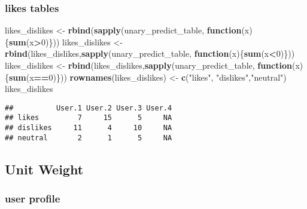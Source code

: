 \documentclass[]{article}
\newenvironment{Shaded}{\begin{snugshade}}{\end{snugshade}}
\newcommand{\ControlFlowTok}[1]{\textcolor[rgb]{0.13,0.29,0.53}{\textbf{#1}}}
\newcommand{\DecValTok}[1]{\textcolor[rgb]{0.00,0.00,0.81}{#1}}
\newcommand{\KeywordTok}[1]{\textcolor[rgb]{0.13,0.29,0.53}{\textbf{#1}}}
\newcommand{\NormalTok}[1]{#1}
\newcommand{\OperatorTok}[1]{\textcolor[rgb]{0.81,0.36,0.00}{\textbf{#1}}}
\newcommand{\StringTok}[1]{\textcolor[rgb]{0.31,0.60,0.02}{#1}}
\begin{document}
\hypertarget{likes-tables}{%
\subsubsection{likes tables}\label{likes-tables}}

\begin{Shaded}
\begin{Highlighting}[]
\NormalTok{likes_dislikes <-}\StringTok{ }\KeywordTok{rbind}\NormalTok{(}\KeywordTok{sapply}\NormalTok{(unary_predict_table, }\ControlFlowTok{function}\NormalTok{(x)\{}\KeywordTok{sum}\NormalTok{(x}\OperatorTok{>}\DecValTok{0}\NormalTok{)\}))}
\NormalTok{likes_dislikes <-}\StringTok{ }\KeywordTok{rbind}\NormalTok{(likes_dislikes,}\KeywordTok{sapply}\NormalTok{(unary_predict_table, }\ControlFlowTok{function}\NormalTok{(x)\{}\KeywordTok{sum}\NormalTok{(x}\OperatorTok{<}\DecValTok{0}\NormalTok{)\}))}
\NormalTok{likes_dislikes <-}\StringTok{ }\KeywordTok{rbind}\NormalTok{(likes_dislikes,}\KeywordTok{sapply}\NormalTok{(unary_predict_table, }\ControlFlowTok{function}\NormalTok{(x)\{}\KeywordTok{sum}\NormalTok{(x}\OperatorTok{==}\DecValTok{0}\NormalTok{)\}))}
\KeywordTok{rownames}\NormalTok{(likes_dislikes) <-}\StringTok{ }\KeywordTok{c}\NormalTok{(}\StringTok{"likes"}\NormalTok{, }\StringTok{"dislikes"}\NormalTok{,}\StringTok{"neutral"}\NormalTok{)}
\NormalTok{likes_dislikes}
\end{Highlighting}
\end{Shaded}

\begin{verbatim}
##          User.1 User.2 User.3 User.4
## likes         7     15      5     NA
## dislikes     11      4     10     NA
## neutral       2      1      5     NA
\end{verbatim}

\hypertarget{unit-weight}{%
\subsection{Unit Weight}\label{unit-weight}}

\hypertarget{user-profile-1}{%
\subsubsection{user profile}\label{user-profile-1}}
\end{document}
